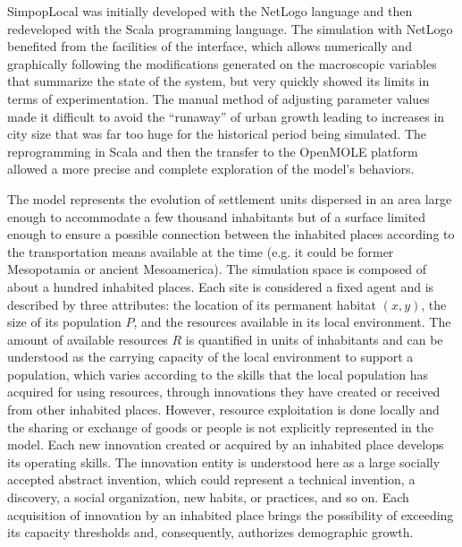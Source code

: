 \documentclass[10pt]{article}
\begin{document}
SimpopLocal was initially developed with the NetLogo language and then redeveloped with the Scala programming language. The simulation with NetLogo benefited from the facilities of the interface, which allows numerically and graphically following the modifications generated on the macroscopic variables that summarize the state of the system, but very quickly showed its limits in terms of experimentation. The manual method of adjusting parameter values made it difficult to avoid the ``runaway'' of urban growth leading to increases in city size that was far too huge for the historical period being simulated. The reprogramming in Scala and then the transfer to the OpenMOLE platform allowed a more precise and complete exploration of the model’s behaviors.

The model represents the evolution of settlement units dispersed in an area large enough to accommodate a few thousand inhabitants but of a surface limited enough to ensure a possible connection between the inhabited places according to the transportation means available at the time (e.g. it could be former Mesopotamia or ancient Mesoamerica). The simulation space is composed of about a hundred inhabited places. Each site is considered a fixed agent and is described by three attributes: the location of its permanent habitat $(x,y)$, the size of its population $P$, and the resources available in its local environment. The amount of available resources $R$ is quantified in units of inhabitants and can be understood as the carrying capacity of the local environment to support a population, which varies according to the skills that the local population has acquired for using resources, through innovations they have created or received from other inhabited places. However, resource exploitation is done locally and the sharing or exchange of goods or people is not explicitly represented in the model. Each new innovation created or acquired by an inhabited place develops its operating skills. The innovation entity is understood here as a large socially accepted abstract invention, which could represent a technical invention, a discovery, a social organization, new habits, or practices, and so on. Each acquisition of innovation by an inhabited place brings the possibility of exceeding its capacity thresholds and, consequently, authorizes demographic growth.
\end{document}
